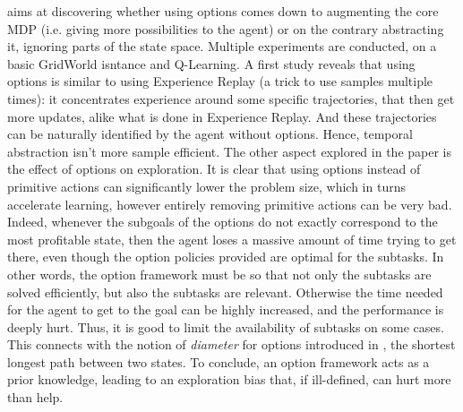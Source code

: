 \citep{jong_utility_2008} aims at discovering whether using options comes down to augmenting the core MDP (i.e. giving more possibilities to the agent) or on the contrary abstracting it, ignoring parts of the state space. Multiple experiments are conducted, on a basic GridWorld isntance and Q-Learning. A first study reveals that using options is similar to using Experience Replay (a trick to use samples multiple times): it concentrates experience around some specific trajectories, that then get more updates, alike what is done in Experience Replay. And these trajectories can be naturally identified by the agent without options. Hence, temporal abstraction isn't more sample efficient. The other aspect explored in the paper is the effect of options on exploration. It is clear that using options instead of primitive actions can significantly lower the problem size, which in turns accelerate learning, however entirely removing primitive actions can be very bad. Indeed, whenever the subgoals of the options do not exactly correspond to the most profitable state, then the agent loses a massive amount of time trying to get there, even though the option policies provided are optimal for the subtasks. In other words, the option framework must be so that not only the subtasks are solved efficiently, but also the subtasks are relevant. Otherwise the time needed for the agent to get to the goal can be highly increased, and the performance is deeply hurt. Thus, it is good to limit the availability of subtasks on some cases. This connects with the notion of \emph{diameter} for options introduced in \citep{fruit_exploration--exploitation_2017}, the shortest longest path between two states. To conclude, an option framework acts as a prior knowledge, leading to an exploration bias that, if ill-defined, can hurt more than help.

